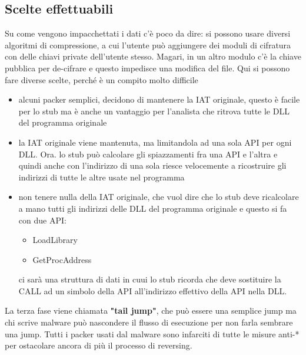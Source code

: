 \documentclass[12pt, oneside]{extbook}
\begin{document}
\subsection{Scelte effettuabili}
Su come vengono impacchettati i dati c'è poco da dire: si possono usare diversi algoritmi di compressione, a cui l'utente può aggiungere dei moduli di cifratura con delle chiavi private dell'utente stesso. Magari, in un altro modulo c'è la chiave pubblica per de-cifrare e questo impedisce una modifica del file.
Qui si possono fare diverse scelte, perché è un compito molto difficile
\begin{itemize}
\item alcuni packer semplici, decidono di mantenere la IAT originale, questo è facile per lo stub ma è anche un vantaggio per l'analista che ritrova tutte le DLL del programma originale
\item la IAT originale viene mantenuta, ma limitandola ad una sola API per ogni DLL. Ora. lo stub può calcolare gli spiazzamenti fra una API e l'altra e quindi anche con l'indirizzo di una sola riesce velocemente a ricostruire gli indirizzi di tutte le altre usate nel programma
\item non tenere nulla della IAT originale, che vuol dire che lo stub deve ricalcolare a mano tutti gli indirizzi delle DLL del programma originale e questo si fa con due API:
\begin{itemize}
\item LoadLibrary
\item GetProcAddress
\end{itemize}
ci sarà una struttura di dati in cuui lo stub ricorda che deve sostituire la CALL ad un simbolo della API all'indirizzo effettivo della API nella DLL.
\end{itemize}
La terza fase viene chiamata \textbf{"tail jump"}, che può essere una semplice jump ma chi scrive malware può nascondere il flusso di esecuzione per non farla sembrare una jump. Tutti i packer usati dal malware sono infarciti di tutte le misure anti-* per ostacolare ancora di più il processo di reversing.
\end{document}
